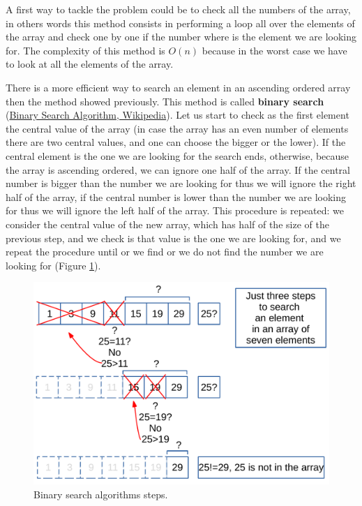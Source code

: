 A first way to tackle the problem could be to check all the numbers of the array, in others words this method consists in performing a loop all over the elements of the array and check one by one if the number where is the element we are looking for. The complexity of this method is \(O(n)\) because in the worst case we have to look at all the elements of the array. 

There is a more efficient way to search an element in an ascending ordered array then the method showed previously. This method is called \textbf{binary search} \cite{wikibinarysearch} (\href{https://en.wikipedia.org/wiki/Binary_search_algorithm}{Binary Search Algorithm, Wikipedia}).
Let us start to check as the first element the central value of the array (in case the array has an even number of elements there are two central values, and one can choose the bigger or the lower). If the central element is the one we are looking for the search ends, otherwise, because the array is ascending ordered, we can ignore one half of the array. If the central number is bigger than the number we are looking for thus we will ignore the right half of the array, if the central number is lower than the number we are looking for thus we will ignore the left half of the array. This procedure is repeated: we consider the central value of the new array, which has half of the size of the previous step, and we check is that value is the one we are looking for, and we repeat the procedure until or we find or we do not find the number we are looking for (Figure \ref{sorting_2}). 

\begin{figure}[H]
	\begin{center}
		\includegraphics[scale=.6]{chapters/searchandsorting/images/sorting_2.pdf}
		\caption[Binary search algorithms steps.]{Binary search algorithms steps.}
		\label{sorting_2}
	\end{center}
\end{figure}

